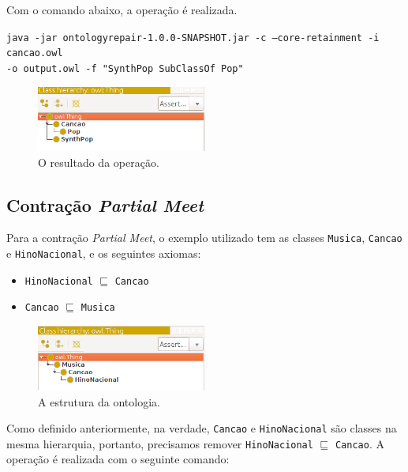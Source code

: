 Com o comando abaixo, a operação é realizada.

\begin{small}
	\texttt{java -jar ontologyrepair-1.0.0-SNAPSHOT.jar -c --core-retainment -i cancao.owl \\ -o output.owl -f "SynthPop SubClassOf Pop"}
\end{small}

\begin{figure}[H]
	\centering
	\includegraphics[width=0.5\textwidth]{Capitulos/Implementacao/ck2.png}
	\caption{O resultado da operação.}
\end{figure}


\subsection{Contração \textit{Partial Meet}}

Para a contração \textit{Partial Meet}, o exemplo utilizado tem as classes \texttt{Musica}, \texttt{Cancao} e \texttt{HinoNacional}, e os seguintes axiomas: 

\begin{itemize}
	\item \texttt{HinoNacional} $ \sqsubseteq $ \texttt{Cancao}
	\item \texttt{Cancao} $ \sqsubseteq $ \texttt{Musica}
\end{itemize}

\begin{figure}[H]
	\centering
	\includegraphics[width=0.5\textwidth]{Capitulos/Implementacao/cpm1.png}
	\caption{A estrutura da ontologia.}
\end{figure}

Como definido anteriormente, na verdade, \texttt{Cancao} e \texttt{HinoNacional} são classes na mesma hierarquia, portanto, precisamos remover \texttt{HinoNacional} $ \sqsubseteq $ \texttt{Cancao}. A operação é realizada com o seguinte comando:

